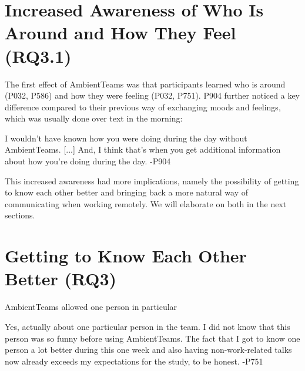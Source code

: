 

\section{Increased Awareness of Who Is Around and How They Feel (RQ3.1)}

The first effect of AmbientTeams was that participants learned who is around (P032, P586) and how they were feeling (P032, P751). P904 further noticed a key difference compared to their previous way of exchanging moods and feelings, which was usually done over text in the morning:


\begin{displayquote}[][]
    [...] I wouldn't have known how you were doing during the day without AmbientTeams. [...] And, I think that's when you get additional information about how you're doing during the day. -P904
\end{displayquote}

This increased awareness had more implications, namely the possibility of getting to know each other better and bringing back a more natural way of communicating when working remotely. We will elaborate on both in the next sections.

\section{Getting to Know Each Other Better (RQ3)}
AmbientTeams allowed one person in particular

\begin{displayquote}
    Yes, actually about one particular person in the team. I did not know that this person was so funny before using AmbientTeams. The fact that I got to know one person a lot better during this one week and also having non-work-related talks now already exceeds my expectations for the study, to be honest. -P751
\end{displayquote}

